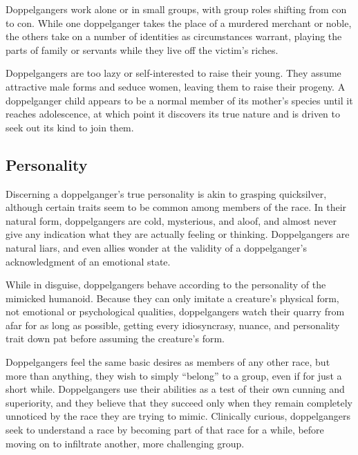{Doppelgangers work alone or in small groups, with group roles shifting from con to con. While one doppelganger takes the place of a murdered merchant or noble, the others take on a number of identities as circumstances warrant, playing the parts of family or servants while they live off the victim's riches.}

{Doppelgangers are too lazy or self-interested to raise their young. They assume attractive male forms and seduce women, leaving them to raise their progeny. A doppelganger child appears to be a normal member of its mother's species until it reaches adolescence, at which point it discovers its true nature and is driven to seek out its kind to join them.}

\subsection{Personality}
{Discerning a doppelganger’s true personality is akin to grasping quicksilver, although certain traits seem to be common among members of the race. In their natural form, doppelgangers are cold, mysterious, and aloof, and almost never give any indication what they are actually feeling or thinking. Doppelgangers are natural liars, and even allies wonder at the validity of a doppelganger’s acknowledgment of an emotional state.

While in disguise, doppelgangers behave according to the personality of the mimicked humanoid. Because they can only imitate a creature’s physical form, not emotional or psychological qualities, doppelgangers watch their quarry from afar for as long as possible, getting every idiosyncrasy, nuance, and personality trait down pat before assuming the creature’s form.

Doppelgangers feel the same basic desires as members of any other race, but more than anything, they wish to simply “belong” to a group, even if for just a short while. Doppelgangers use their abilities as a test of their own cunning and superiority, and they believe that they succeed only when they remain completely unnoticed by the race they are trying to mimic. Clinically curious, doppelgangers seek to understand a race by becoming part of that race for a while, before moving on to infiltrate another, more challenging group.}


